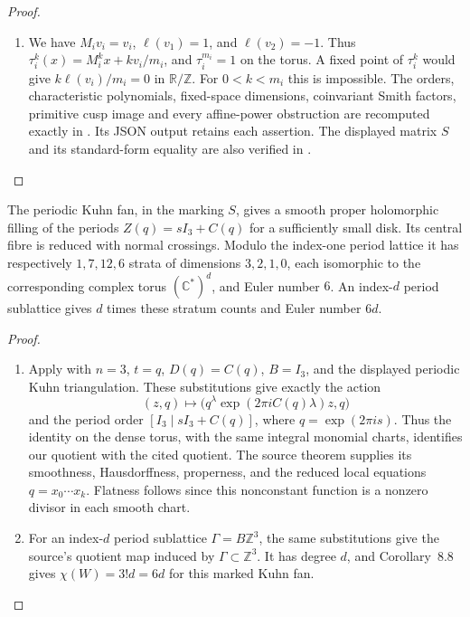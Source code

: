 \begin{proof}
\begin{enumerate}[label=\arabic*.]
\item We have $M_iv_i=v_i$, $\ell(v_1)=1$, and $\ell(v_2)=-1$.
Thus $\tau_i^k(x)=M_i^kx+kv_i/m_i$, and $\tau_i^{m_i}=1$ on the
torus.  A fixed point of $\tau_i^k$ would give
$k\ell(v_i)/m_i=0$ in $\mathbb R/\mathbb Z$.  For
$0<k<m_i$ this is impossible.  The orders, characteristic polynomials, fixed-space dimensions,
coinvariant Smith factors, primitive cusp image and every affine-power
obstruction are recomputed exactly in
.
Its JSON output retains each assertion. The displayed matrix $S$ and its
standard-form equality are also verified in
.

\end{enumerate}
\end{proof}

\begin{theorem}\label{night:P1.9}
The periodic Kuhn fan, in the marking $S$, gives a smooth proper
holomorphic filling of the periods $Z(q)=sI_3+C(q)$ for a sufficiently
small disk.  Its central fibre is reduced with normal crossings.
Modulo the index-one period lattice it has respectively $1,7,12,6$
strata of dimensions $3,2,1,0$, each isomorphic to the corresponding
complex torus $(\mathbb C^*)^d$, and Euler number $6$.
An index-$d$ period sublattice gives $d$ times these stratum counts and
Euler number $6d$.
\end{theorem}
\begin{proof}
\begin{enumerate}[label=\arabic*.]
\item Apply \cite[Theorem~8.7 and Corollary~8.8, attached-source edition, pp.~57--59]{Yang2026}
with $n=3$, $t=q$, $D(q)=C(q)$, $B=I_3$, and the displayed
periodic Kuhn triangulation.  These substitutions give exactly the
action
\[
 (z,q)\longmapsto
 \bigl(q^\lambda\exp(2\pi iC(q)\lambda)z,q\bigr)
\]
and the period order $[I_3\mid sI_3+C(q)]$, where
$q=\exp(2\pi i s)$.  Thus the identity on the dense torus, with
the same integral monomial charts, identifies our quotient with
the cited quotient.  The source theorem supplies its smoothness,
Hausdorffness, properness, and the reduced local equations
$q=x_0\cdots x_k$.  Flatness follows since this nonconstant
function is a nonzero divisor in each smooth chart.
\item For an index-$d$ period sublattice $\Gamma=B\mathbb Z^3$,
the same substitutions give the source's quotient map induced
by $\Gamma\subset\mathbb Z^3$.  It has degree $d$, and
Corollary~8.8 gives $\chi(W)=3!d=6d$ for this marked Kuhn fan.
\end{enumerate}
\end{proof}
